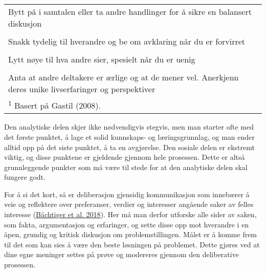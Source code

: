 \documentclass[
  12pt,
  a4paper, 12pt]{article}
\begin{document}
\begin{table}[!h]
{\begin{tabular}[t]{l}
\hspace{1em}Bytt på i samtalen eller ta andre handlinger for å sikre en balansert diskusjon\\
 
\hspace{1em}\cellcolor{gray!6}{Sørg for at alle forstår}\\
 
\hspace{1em}Snakk tydelig til hverandre og be om avklaring når du er forvirret\\
 
\hspace{1em}\cellcolor{gray!6}{Vurder andres ideer og erfaringer}\\
 
\hspace{1em}Lytt nøye til hva andre sier, spesielt når du er uenig\\
 
\hspace{1em}\cellcolor{gray!6}{Respektér andre deltakere}\\
 
\hspace{1em}Anta at andre deltakere er ærlige og at de mener vel. Anerkjenn deres unike livserfaringer og perspektiver\\
\bottomrule
\multicolumn{1}{l}{\rule{0pt}{1em}\textsuperscript{1} Basert på Gastil (2008).}\\
\end{tabular}}
\end{table}

Den analytiske delen skjer ikke nødvendigvis stegvis, men man starter ofte med det første punktet, å lage et solid kunnskaps- og læringsgrunnlag, og man ender alltid opp på det siste punktet, å ta en avgjørelse. Den sosiale delen er ekstremt viktig, og disse punktene er gjeldende gjennom hele prosessen. Dette er altså grunnleggende punkter som må være til stede for at den analytiske delen skal fungere godt.

For å si det kort, så er deliberasjon gjensidig kommunikasjon som innebærer å veie og reflektere over preferanser, verdier og interesser angående saker av felles interesse (\protect\hyperlink{ref-bachtiger_deliberative_2018}{Bächtiger et al. 2018}). Her må man derfor utforske alle sider av saken, som fakta, argumentasjon og erfaringer, og sette disse opp mot hverandre i en åpen, grundig og kritisk diskusjon om problemstillingen. Målet er å komme frem til det som kan sies å være den beste løsningen på problemet. Dette gjøres ved at dine egne meninger settes på prøve og modereres gjennom den deliberative prosessen.
\end{document}
